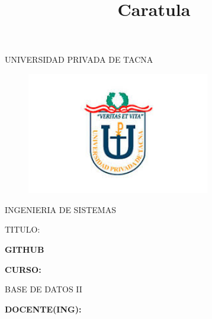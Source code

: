 \documentclass[12pt,letterpaper]{article}
\begin{document}
%


\title{Caratula}

\begin{titlepage}
\begin{center}
\large{UNIVERSIDAD PRIVADA DE TACNA}\\
\vspace*{-0.025in}
\begin{figure}[htb]
\begin{center}
\includegraphics[width=8cm]{./Imagenes/logo}
\end{center}
\end{figure}
\vspace*{0.15in}
INGENIERIA DE SISTEMAS  \\

\vspace*{0.5in}
\begin{large}
TITULO:\\
\end{large}

\vspace*{0.1in}
\begin{Large}
\textbf{ GITHUB} \\
\end{Large}

\vspace*{0.3in}
\begin{Large}
\textbf{CURSO:} \\
\end{Large}

\vspace*{0.1in}
\begin{large}
BASE DE DATOS II\\
\end{large}

\vspace*{0.3in}
\begin{Large}
\textbf{DOCENTE(ING):} \\
\end{Large}


\end{center}
\end{titlepage}
\end{document}
